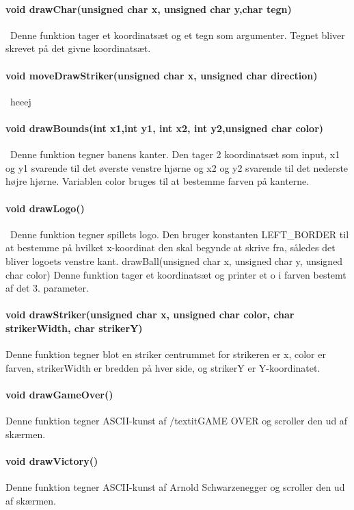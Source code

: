 \paragraph{void drawChar(unsigned char x, unsigned char y,char tegn)}\
Denne funktion tager et koordinatsæt og et tegn som argumenter. Tegnet bliver skrevet på det givne koordinatsæt.

\paragraph{void moveDrawStriker(unsigned char x, unsigned char direction)}\
heeej

\paragraph{void drawBounds(int x1,int y1, int x2, int y2,unsigned char color)}\
Denne funktion tegner banens kanter. Den tager 2 koordinatsæt som input, x1 og y1 svarende til det øverste venstre hjørne og  x2 og y2 svarende til det nederste højre hjørne. Variablen color bruges til at bestemme farven på kanterne. 

\paragraph{void drawLogo()}\
Denne funktion tegner spillets logo. Den bruger konstanten LEFT\_BORDER til at bestemme på hvilket x-koordinat den skal begynde at skrive fra, således det bliver logoets venstre kant.
drawBall(unsigned char x, unsigned char y, unsigned char color)
Denne funktion tager et koordinatsæt og printer et o i farven bestemt af det 3. parameter.

\paragraph{void drawStriker(unsigned char x, unsigned char color, char strikerWidth, char strikerY)}
Denne funktion tegner blot en striker centrummet for strikeren er x, color er farven, strikerWidth er bredden på hver side, og strikerY er Y-koordinatet.

\paragraph{void drawGameOver()}
Denne funktion tegner ASCII-kunst af /textit{GAME OVER} og scroller den ud af skærmen.

\paragraph{void drawVictory()}
Denne funktion tegner ASCII-kunst af Arnold Schwarzenegger og scroller den ud af skærmen.

